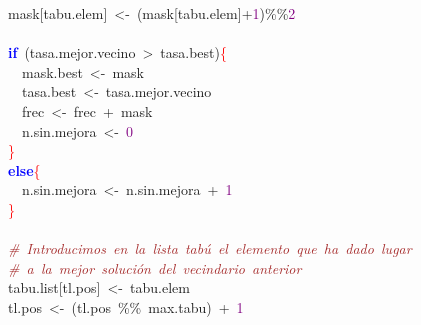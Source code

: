 \mbox{}\ \ \ \ mask\textcolor{BrickRed}{[}tabu\textcolor{BrickRed}{.}elem\textcolor{BrickRed}{]}\ \textcolor{BrickRed}{\textless{}-}\ \textcolor{BrickRed}{(}mask\textcolor{BrickRed}{[}tabu\textcolor{BrickRed}{.}elem\textcolor{BrickRed}{]+}\textcolor{Purple}{1}\textcolor{BrickRed}{)\%\%}\textcolor{Purple}{2} \\
\mbox{}\ \ \ \  \\
\mbox{}\ \ \ \ \textbf{\textcolor{Blue}{if}}\ \textcolor{BrickRed}{(}tasa\textcolor{BrickRed}{.}mejor\textcolor{BrickRed}{.}vecino\ \textcolor{BrickRed}{\textgreater{}}\ tasa\textcolor{BrickRed}{.}best\textcolor{BrickRed}{)}\textcolor{Red}{\{} \\
\mbox{}\ \ \ \ \ \ mask\textcolor{BrickRed}{.}best\ \textcolor{BrickRed}{\textless{}-}\ mask \\
\mbox{}\ \ \ \ \ \ tasa\textcolor{BrickRed}{.}best\ \textcolor{BrickRed}{\textless{}-}\ tasa\textcolor{BrickRed}{.}mejor\textcolor{BrickRed}{.}vecino \\
\mbox{}\ \ \ \ \ \ frec\ \textcolor{BrickRed}{\textless{}-}\ frec\ \textcolor{BrickRed}{+}\ mask \\
\mbox{}\ \ \ \ \ \ n\textcolor{BrickRed}{.}sin\textcolor{BrickRed}{.}mejora\ \textcolor{BrickRed}{\textless{}-}\ \textcolor{Purple}{0} \\
\mbox{}\ \ \ \ \textcolor{Red}{\}} \\
\mbox{}\ \ \ \ \textbf{\textcolor{Blue}{else}}\textcolor{Red}{\{} \\
\mbox{}\ \ \ \ \ \ n\textcolor{BrickRed}{.}sin\textcolor{BrickRed}{.}mejora\ \textcolor{BrickRed}{\textless{}-}\ n\textcolor{BrickRed}{.}sin\textcolor{BrickRed}{.}mejora\ \textcolor{BrickRed}{+}\ \textcolor{Purple}{1} \\
\mbox{}\ \ \ \ \textcolor{Red}{\}} \\
\mbox{}\ \ \ \  \\
\mbox{}\ \ \ \ \textit{\textcolor{Brown}{\#\ Introducimos\ en\ la\ lista\ tabú\ el\ elemento\ que\ ha\ dado\ lugar}} \\
\mbox{}\ \ \ \ \textit{\textcolor{Brown}{\#\ a\ la\ mejor\ solución\ del\ vecindario\ anterior}} \\
\mbox{}\ \ \ \ tabu\textcolor{BrickRed}{.}list\textcolor{BrickRed}{[}tl\textcolor{BrickRed}{.}pos\textcolor{BrickRed}{]}\ \textcolor{BrickRed}{\textless{}-}\ tabu\textcolor{BrickRed}{.}elem \\
\mbox{}\ \ \ \ tl\textcolor{BrickRed}{.}pos\ \textcolor{BrickRed}{\textless{}-}\ \textcolor{BrickRed}{(}tl\textcolor{BrickRed}{.}pos\ \textcolor{BrickRed}{\%\%}\ max\textcolor{BrickRed}{.}tabu\textcolor{BrickRed}{)}\ \textcolor{BrickRed}{+}\ \textcolor{Purple}{1} \\
